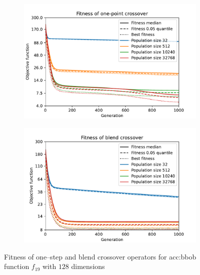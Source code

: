 \begin{figure}[ht!]
    \begin{subfigure}[t]{0.48\textwidth}
        \includegraphics[width=\textwidth]{img/runs/fitness_es_crossover_OnePoint1D_with_legend.pdf}
    \end{subfigure}
    \hfill
    \begin{subfigure}[t]{0.48\textwidth}
        \includegraphics[width=\textwidth]{img/runs/fitness_es_crossover_Blend_with_legend.pdf}
    \end{subfigure}
    \caption[Fitness of crossover operators]{Fitness of one--step and blend crossover operators for \acrshort*{acc:bbob} function $f_{19}$ with $128$ dimensions}
    \label{fig:escrossfitness}
\end{figure}

